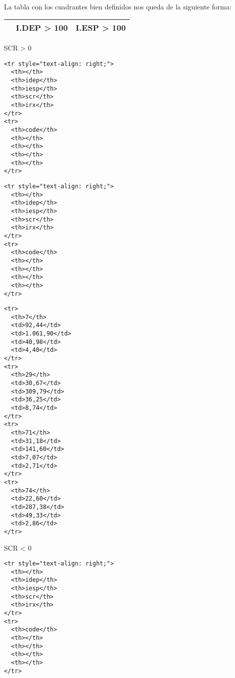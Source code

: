 \documentclass[11pt]{article}
\begin{document}
    \begin{center}
    \end{center}
    { \hspace*{\fill} \\}
    
    La tabla con los cuadrantes bien definidos nos queda de la siguiente
forma:

\begin{longtable}[]{@{}lcc@{}}
\toprule
& I.DEP \textgreater{} 100 & I.ESP \textgreater{} 100\tabularnewline
\midrule
\endhead
\bottomrule
\end{longtable}

\textbar{}SCR \textgreater{} 0\textbar{}

\begin{verbatim}
<tr style="text-align: right;">
  <th></th>
  <th>idep</th>
  <th>iesp</th>
  <th>scr</th>
  <th>irx</th>
</tr>
<tr>
  <th>code</th>
  <th></th>
  <th></th>
  <th></th>
  <th></th>
</tr>
\end{verbatim}

\textbar{}

\begin{verbatim}
<tr style="text-align: right;">
  <th></th>
  <th>idep</th>
  <th>iesp</th>
  <th>scr</th>
  <th>irx</th>
</tr>
<tr>
  <th>code</th>
  <th></th>
  <th></th>
  <th></th>
  <th></th>
</tr>
\end{verbatim}

\begin{verbatim}
<tr>
  <th>7</th>
  <td>92,44</td>
  <td>1.061,90</td>
  <td>40,98</td>
  <td>4,40</td>
</tr>
<tr>
  <th>29</th>
  <td>30,67</td>
  <td>309,79</td>
  <td>36,25</td>
  <td>8,74</td>
</tr>
<tr>
  <th>71</th>
  <td>31,18</td>
  <td>141,60</td>
  <td>7,07</td>
  <td>2,71</td>
</tr>
<tr>
  <th>74</th>
  <td>22,60</td>
  <td>287,38</td>
  <td>49,33</td>
  <td>2,86</td>
</tr>
\end{verbatim}

\textbar{} \textbar{}SCR \textless{} 0\textbar{}

\begin{verbatim}
<tr style="text-align: right;">
  <th></th>
  <th>idep</th>
  <th>iesp</th>
  <th>scr</th>
  <th>irx</th>
</tr>
<tr>
  <th>code</th>
  <th></th>
  <th></th>
  <th></th>
  <th></th>
</tr>
\end{verbatim}
\end{document}
